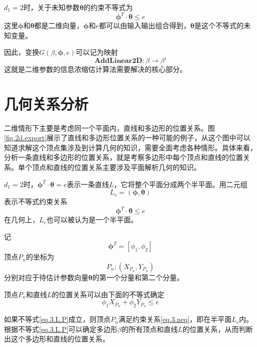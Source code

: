 $d_{1}=2$时，关于未知参数$\bm{\theta}$的约束不等式为
\begin{equation}\label{eq.3.L}
\bm{\phi}^{T}\cdot\bm{\theta}\leq e
\end{equation}
这里$\bm{\phi}$和$\bm{\theta}$都是二维向量，$\bm{\phi}$和$e$都可以由输入输出组合得到，$\bm{\theta}$是这个不等式的未知变量。

因此，变换$G(\beta,\bm{\phi},e)$可以记为映射
\begin{equation}%
\mathbf{AddLinear2D}\colon \beta\rightarrow\beta'
\end{equation}
这就是二维参数的信息浓缩估计算法需要解决的核心部分。

\section{几何关系分析}\label{sect:3.2}
二维情形下主要是考虑同一个平面内，直线和多边形的位置关系。图\ref{fig.2d.export}展示了直线和多边形位置关系的一种可能的例子，从这个图中可以知道求解这个顶点集涉及到计算几何的知识，需要全面考虑各种情形。具体来看，分析一条直线和多边形的位置关系，就是考察多边形中每个顶点和直线的位置关系。单个顶点和直线的位置关系主要涉及平面解析几何的知识。

$d_{1}=2$时，$\bm{\phi}^{T}\cdot\bm{\theta}=e$表示一条直线$L$，它将整个平面分成两个半平面。用二元组
$$L_{c}=(\bm{\phi},\bm{\theta})$$
表示不等式约束关系
\begin{equation}\label{eq.3.neq}
\bm{\phi}^{T}\cdot\bm{\theta}\leq e
\end{equation}
在几何上，$L_{c}$也可以被认为是一个半平面。

记
$$\bm{\phi}^{T}=[\phi_{1},\phi_{2}]$$
顶点$P_{n}$的坐标为
$$P_{n}\colon (X_{P_{n}},Y_{P_{n}})$$
分别对应于待估计参数向量$\bm{\theta}$的第一个分量和第二个分量。

顶点$P_{n}$和直线$L$的位置关系可以由下面的不等式确定
\begin{equation}\label{eq.3.L.P}
\phi_{1}X_{P_{n}}+\phi_{2}Y_{P_{n}}\leq e
\end{equation}

如果不等式\eqref{eq.3.L.P}成立，则顶点$P_{n}$满足约束关系\eqref{eq.3.neq}，即在半平面$L_{c}$内。根据不等式\eqref{eq.3.L.P}可以确定多边形$\beta$的所有顶点和直线$L$的位置关系，从而判断出这个多边形和直线的位置关系。

